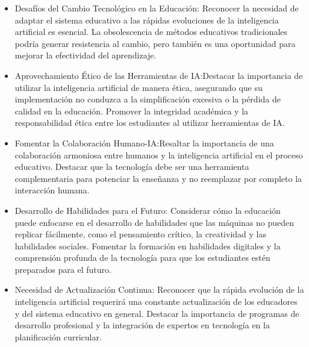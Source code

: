 \documentclass[letterpaper, 12pt]{article}
\begin{document}
\begin{itemize}[label=$\triangleright$]
      \item Desafíos del Cambio Tecnológico en la Educación: Reconocer
            la necesidad de adaptar el sistema educativo a las rápidas
            evoluciones de la inteligencia artificial es esencial. La
            obsolescencia de métodos educativos tradicionales podría
            generar resistencia al cambio, pero también es una
            oportunidad para mejorar la efectividad del aprendizaje.

      \item Aprovechamiento Ético de las Herramientas de
            IA:\@{}Destacar la importancia de utilizar la inteligencia
            artificial de manera ética, asegurando que su
            implementación no conduzca a la simplificación excesiva o
            la pérdida de calidad en la educación. Promover la
            integridad académica y la responsabilidad ética entre los
            estudiantes al utilizar herramientas de IA\@{}.

      \item Fomentar la Colaboración Humano-IA:\@{}Resaltar la
            importancia de una colaboración armoniosa entre humanos y
            la inteligencia artificial en el proceso educativo.
            Destacar que la tecnología debe ser una herramienta
            complementaria para potenciar la enseñanza y no reemplazar
            por completo la interacción humana.

      \item Desarrollo de Habilidades para el Futuro: Considerar cómo
            la educación puede enfocarse en el desarrollo de
            habilidades que las máquinas no pueden replicar fácilmente,
            como el pensamiento crítico, la creatividad y las
            habilidades sociales. Fomentar la formación en habilidades
            digitales y la comprensión profunda de la tecnología para
            que los estudiantes estén preparados para el futuro.

      \item Necesidad de Actualización Continua: Reconocer que la
            rápida evolución de la inteligencia artificial requerirá
            una constante actualización de los educadores y del sistema
            educativo en general. Destacar la importancia de programas
            de desarrollo profesional y la integración de expertos en
            tecnología en la planificación curricular.
\end{itemize}
\end{document}
